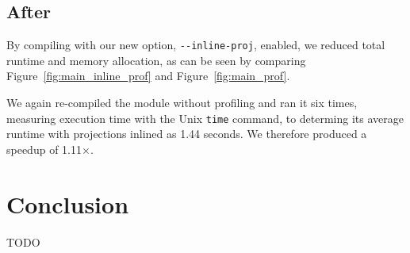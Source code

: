 \subsection{After}



By compiling  with our new option, \texttt{-{}-inline-proj}, enabled, we reduced total runtime and memory allocation, as can be seen by comparing Figure~\ref{fig:main_inline_prof} and Figure~\ref{fig:main_prof}.

We again re-compiled the module without profiling and ran it six times, measuring execution time with the Unix \texttt{time} command, to determing its average runtime with projections inlined as 1.44 seconds. We therefore produced a speedup of 1.11$\times$.

\section{Conclusion}
\label{sec:application_conclusion}

TODO


